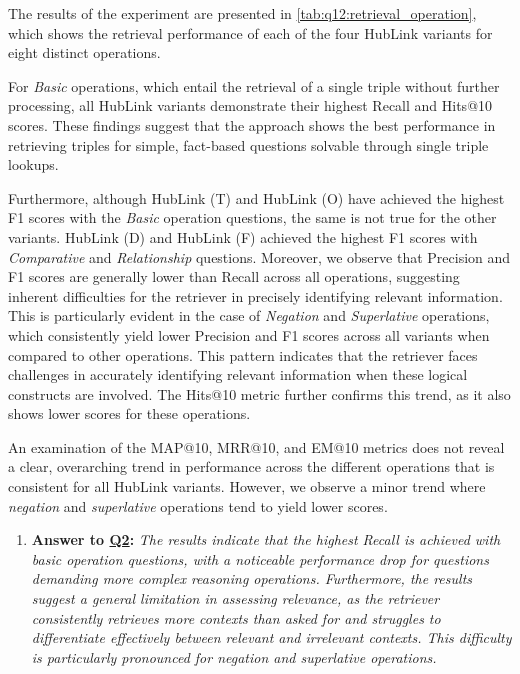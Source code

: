 The results of the experiment are presented in \autoref{tab:q12:retrieval_operation}, which shows the retrieval performance of each of the four HubLink variants for eight distinct operations.

For \emph{Basic} operations, which entail the retrieval of a single triple without further processing, all HubLink variants demonstrate their highest Recall and Hits@10 scores. These findings suggest that the approach shows the best performance in retrieving triples for simple, fact-based questions solvable through single triple lookups. 

Furthermore, although HubLink (T) and HubLink (O) have achieved the highest F1 scores with the \emph{Basic} operation questions, the same is not true for the other variants. HubLink (D) and HubLink (F) achieved the highest F1 scores with \emph{Comparative} and \emph{Relationship} questions. Moreover, we observe that Precision and F1 scores are generally lower than Recall across all operations, suggesting inherent difficulties for the retriever in precisely identifying relevant information. This is particularly evident in the case of \emph{Negation} and \emph{Superlative} operations, which consistently yield lower Precision and F1 scores across all variants when compared to other operations. This pattern indicates that the retriever faces challenges in accurately identifying relevant information when these logical constructs are involved. The Hits@10 metric further confirms this trend, as it also shows lower scores for these operations.

An examination of the MAP@10, MRR@10, and EM@10 metrics does not reveal a clear, overarching trend in performance across the different operations that is consistent for all HubLink variants. However, we observe a minor trend where \emph{negation} and \emph{superlative} operations tend to yield lower scores.


\begin{enumerate}[label={}]
    \item \textbf{Answer to \hyperref[sec:evaluation_gqm_plan]{Q2}:} \textit{The results indicate that the highest Recall is achieved with basic operation questions, with a noticeable performance drop for questions demanding more complex reasoning operations. Furthermore, the results suggest a general limitation in assessing relevance, as the retriever consistently retrieves more contexts than asked for and struggles to differentiate effectively between relevant and irrelevant contexts. This difficulty is particularly pronounced for negation and superlative operations.}
\end{enumerate}


